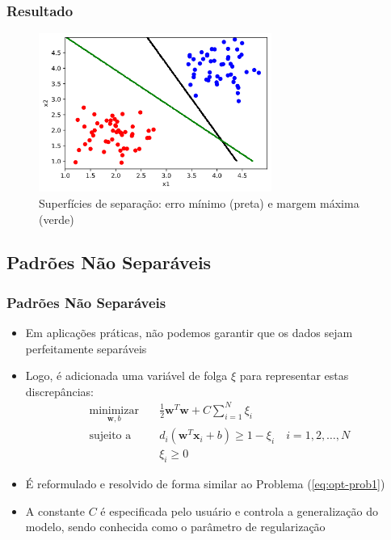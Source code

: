 \documentclass{beamer}
\begin{document}
\begin{frame}
	\frametitle{Resultado}
	\begin{figure}[h!]
		\centering
		\includegraphics[width=3in]{fig02.png}
		\caption{Superfícies de separação: erro mínimo (preta) e margem máxima (verde)}
		\label{fig:opt-margin-ds}
	\end{figure}
\end{frame}

\subsection{Padrões Não Separáveis}
\begin{frame}
	\frametitle{Padrões Não Separáveis}
	\begin{itemize}
		\item Em aplicações práticas, não podemos garantir que os dados sejam perfeitamente separáveis
		\item Logo, é adicionada uma variável de folga $\xi$ para representar estas discrepâncias:
		\begin{align}
			\underset{\textbf{w},b}{\text{minimizar}} \quad & \frac{1}{2}\textbf{w}^T\textbf{w} + C\sum_{i=1}^{N}\xi_i \\ 
			\text{sujeito a} \quad & d_i(\textbf{w}^T\textbf{x}_i + b) \geq 1 - \xi_i \quad i=1,2,\dots,N   \nonumber \\
			& \xi_i \geq 0 \nonumber
		\end{align} 
		\item É reformulado e resolvido de forma similar ao Problema (\ref{eq:opt-prob1})
		\item A constante $C$ é especificada pelo usuário e controla a generalização do modelo, sendo conhecida como o parâmetro de regularização
	\end{itemize}
	
\end{frame}
\end{document}
